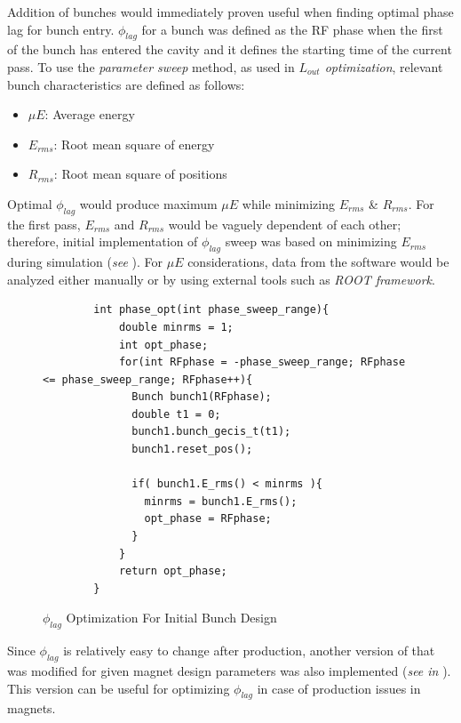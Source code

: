 \documentclass{book}
\begin{document}
Addition of bunches would immediately proven useful when finding optimal phase lag for bunch entry.
$\phi_{lag}$ for a bunch was defined as the RF phase when the first \e of the bunch has entered the cavity and it defines the starting time of the current pass.
To use the \textit{parameter sweep} method, as used in \textit{$L_{out}$ optimization}, relevant bunch characteristics are defined as follows:
\begin{itemize}
    \item $\mu E$: Average energy
    \item $E_{rms}$: Root mean square of energy
    \item $R_{rms}$: Root mean square of \e positions
\end{itemize}
Optimal $\phi_{lag}$ would produce maximum $\mu E$ while minimizing $E_{rms}$ \& $R_{rms}$. For the first pass, 
$E_{rms}$ and $R_{rms}$ would be vaguely dependent of each other; therefore, initial implementation of $\phi_{lag}$ sweep was based on minimizing $E_{rms}$ during simulation (\textit{see }). 
For $\mu E$ considerations, data from the software would be analyzed either manually or by using external tools such as \textit{ROOT framework}. 
\begin{figure}[H]
    \centering
    \captionsetup{justification=centering}
    \begin{verbatim}
        int phase_opt(int phase_sweep_range){
            double minrms = 1;
            int opt_phase;
            for(int RFphase = -phase_sweep_range; RFphase <= phase_sweep_range; RFphase++){
              Bunch bunch1(RFphase);
              double t1 = 0;
              bunch1.bunch_gecis_t(t1);
              bunch1.reset_pos();
        
              if( bunch1.E_rms() < minrms ){
                minrms = bunch1.E_rms();
                opt_phase = RFphase;
              }
            }
            return opt_phase;
        }
    \end{verbatim}
    \caption{$\phi_{lag}$ Optimization For Initial Bunch Design}
    \label{fig:phlag_opt}
\end{figure}
Since $\phi_{lag}$ is relatively easy to change after production, another version of  that was modified for given magnet design parameters was also implemented (\textit{see  in }). 
This version can be useful for optimizing $\phi_{lag}$ in case of production issues in magnets. 
\end{document}

